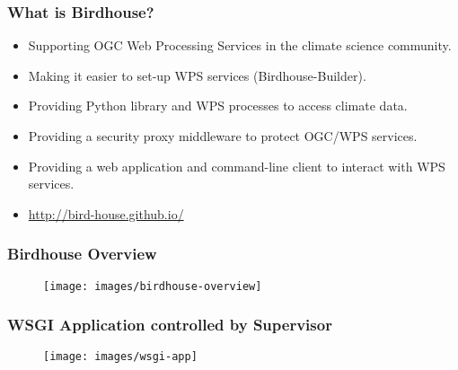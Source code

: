 \documentclass{beamer}
\begin{document}
\begin{frame}
\frametitle<presentation>{What is Birdhouse?}

\begin{itemize}
  \item Supporting OGC Web Processing Services in the climate science community.
  \item Making it easier to set-up WPS services (Birdhouse-Builder).
  \item Providing Python library and WPS processes to access climate data.
  \item Providing a security proxy middleware to protect OGC/WPS services.
  \item Providing a web application and command-line client to interact with WPS services.
  \item \url{http://bird-house.github.io/}

\end{itemize}
\end{frame}


\begin{frame}
\frametitle<presentation>{Birdhouse Overview}

  \begin{figure}[ht]
    \centering
    \texttt{[image: images/birdhouse-overview]}
  \end{figure}

\end{frame}

\begin{frame}
\frametitle<presentation>{WSGI Application controlled by Supervisor}

  \begin{figure}[ht]
    \centering
    \texttt{[image: images/wsgi-app]}
  \end{figure}

\end{frame}
\end{document}
